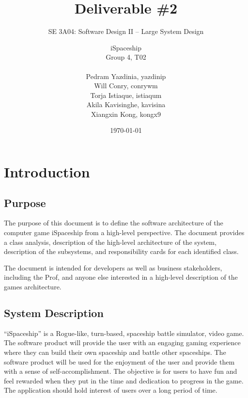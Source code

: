 \documentclass[]{article}
\title{Deliverable \#2}
\author{SE 3A04: Software Design II -- Large System Design}
\author{   iSpaceship
        \\ Group 4, T02
        \\
		\\ Pedram Yazdinia, yazdinip
		\\ Will Conry, conrywm
		\\ Torja Istiaque, istiaqum
		\\ Akila Kavisinghe, kavisina
		\\ Xiangxin Kong, kongx9
}
\date{\today}
\begin{document}
\maketitle	

\section{Introduction}
\label{sec:introduction}


\subsection{Purpose}
\label{sub:purpose}
	        

The purpose of this document is to define the software architecture of the computer game iSpaceship from a high-level perspective. The document provides a class analysis, description of the high-level architecture of the system, description of the subsystems, and responsibility cards for each identified class. 

The document is intended for developers as well as business stakeholders, including the Prof, and anyone else interested in a high-level description of the games architecture.


\subsection{System Description}
\label{sub:system_description}
 “iSpaceship” is a Rogue-like, turn-based, spaceship battle simulator, video game. The software product will provide the user with an engaging gaming experience where they can build their own spaceship and battle other spaceships. 	The software product will be used for the enjoyment of the user and provide them with a sense of self-accomplishment. The objective is for users to have fun and feel rewarded when they put in the time and dedication to progress in the game. The application should hold interest of users over a long period of time.
\end{document}
